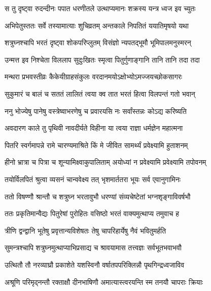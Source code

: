 \twolineshloka
{स तु दृष्ट्वा रुदन्दीनः पपात धरणीतले}
{उत्थाप्यमानः शक्रस्य यन्त्र ध्वज इव च्युतः} %

\twolineshloka
{अभिपेतुस्ततः सर्वे तस्यामात्याः शुचिव्रतम्}
{अन्तकाले निपतितं ययातिमृषयो यथा} %

\twolineshloka
{शत्रुघ्नश्चापि भरतं दृष्ट्वा शोकपरिप्लुतम्}
{विसंज्ञो न्यपतद्भूमौ भूमिपालमनुस्मरन्} %

\twolineshloka
{उन्मत्त इव निश्चेता विललाप सुदुःखितः}
{स्मृत्वा पितुर्गुणाङ्गानि तानि तानि तदा तदा} %

\twolineshloka
{मन्थरा प्रभवस्तीव्रः कैकेयीग्राहसंकुलः}
{वरदानमयोऽक्षोभ्योऽमज्जयच्छोकसागरः} %

\twolineshloka
{सुकुमारं च बालं च सततं लालितं त्वया}
{क्व तात भरतं हित्वा विलपन्तं गतो भवान्} %

\twolineshloka
{ननु भोज्येषु पानेषु वस्त्रेष्वाभरणेषु च}
{प्रवारयसि नः सर्वांस्तन्नः कोऽद्य करिष्यति} %

\twolineshloka
{अवदारण काले तु पृथिवी नावदीर्यते}
{विहीना या त्वया राज्ञा धर्मज्ञेन महात्मना} %

\twolineshloka
{पितरि स्वर्गमापन्ने रामे चारण्यमाश्रिते}
{किं मे जीवित सामर्थ्यं प्रवेक्ष्यामि हुताशनम्} %

\twolineshloka
{हीनो भ्रात्रा च पित्रा च शून्यामिक्ष्वाकुपालिताम्}
{अयोध्यां न प्रवेक्ष्यामि प्रवेक्ष्यामि तपोवनम्} %

\twolineshloka
{तयोर्विलपितं श्रुत्वा व्यसनं चान्ववेक्ष्य तत्}
{भृशमार्ततरा भूयः सर्व एवानुगामिनः} %

\twolineshloka
{ततो विषण्णौ श्रान्तौ च शत्रुघ्न भरतावुभौ}
{धरण्यां संव्यचेष्टेतां भग्नशृङ्गाविवर्षभौ} %

\twolineshloka
{ततः प्रकृतिमान्वैद्यः पितुरेषां पुरोहितः}
{वसिष्ठो भरतं वाक्यमुत्थाप्य तमुवाच ह} %

\twolineshloka
{त्रीणि द्वन्द्वानि भूतेषु प्रवृत्तान्यविशेषतः}
{तेषु चापरिहार्येषु नैवं भवितुमर्हति} %

\twolineshloka
{सुमन्त्रश्चापि शत्रुघ्नमुत्थाप्याभिप्रसाद्य च}
{श्रावयामास तत्त्वज्ञः सर्वभूतभवाभवौ} %

\twolineshloka
{उत्थितौ तौ नरव्याघ्रौ प्रकाशेते यशस्विनौ}
{वर्षातपपरिक्लिन्नौ पृथगिन्द्रध्वजाविव} %

\twolineshloka
{अश्रूणि परिमृद्नन्तौ रक्ताक्षौ दीनभाषिणौ}
{अमात्यास्त्वरयन्ति स्म तनयौ चापराः क्रियाः} %



